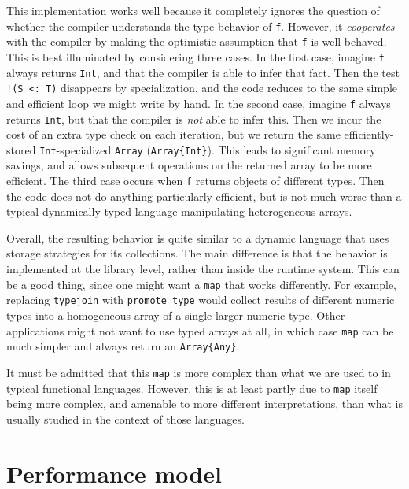 This implementation works well because it completely ignores the
question of whether the compiler understands the type behavior of
\texttt{f}.
However, it \emph{cooperates} with the compiler by making the
optimistic assumption that \texttt{f} is well-behaved.
This is best illuminated by considering three cases.
In the first case, imagine \texttt{f} always returns \texttt{Int},
and that the compiler is able to infer that fact.
Then the test \texttt{!(S <: T)} disappears by specialization,
and the code reduces to the same simple and efficient loop we
might write by hand.
In the second case, imagine \texttt{f} always returns \texttt{Int},
but that the compiler is \emph{not} able to infer this.
Then we incur the cost of an extra type check on each iteration,
but we return the same efficiently-stored \texttt{Int}-specialized
\texttt{Array} (\texttt{Array\{Int\}}).
This leads to significant memory savings, and allows subsequent
operations on the returned array to be more efficient.
The third case occurs when \texttt{f} returns objects of different
types.
Then the code does not do anything particularly efficient, but is
not much worse than a typical dynamically typed language manipulating
heterogeneous arrays.

Overall, the resulting behavior is quite similar to a dynamic
language that uses storage strategies \cite{Bolz2013} for its
collections.
The main difference is that the behavior is implemented at the
library level, rather than inside the runtime system.
This can be a good thing, since one might want a \texttt{map} that
works differently.
For example, replacing \texttt{typejoin} with \texttt{promote\_type}
would collect results of different numeric types into a
homogeneous array of a single larger numeric type.
Other applications might not want to use typed arrays at all, in
which case \texttt{map} can be much simpler and always return an
\texttt{Array\{Any\}}.

It must be admitted that this \texttt{map} is more complex than
what we are used to in typical functional languages.
However, this is at least partly due to \texttt{map} itself
being more complex, and amenable to more different interpretations,
than what is usually studied in the context of those languages.



\section{Performance model}

